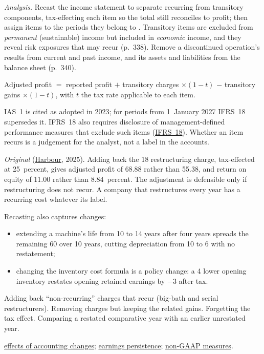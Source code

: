 \begin{qfmethod}
\emph{Analysis.} Recast the income statement to separate recurring from transitory components, tax-effecting each item so the total still reconciles to profit; then assign items to the periods they belong to \citep[pp.~602--603]{financial-statement-analysis-2009}. Transitory items are excluded from \emph{permanent} (sustainable) income but included in \emph{economic} income, and they reveal risk exposures that may recur (p.~338). Remove a discontinued operation's results from current and past income, and its assets and liabilities from the balance sheet (p.~340).

 Adjusted profit $=$ reported profit $+$ transitory charges $\times(1-t)$ $-$ transitory gains $\times(1-t)$, with $t$ the tax rate applicable to each item.

 IAS~1 is cited as adopted in 2023; for periods from 1~January 2027 IFRS~18 supersedes it. IFRS~18 also requires disclosure of management-defined performance measures that exclude such items (\hyperref[meth:accounting-change-effects]{IFRS~18}). Whether an item recurs is a judgement for the analyst, not a label in the accounts.

 \emph{Original} (\hyperref[ex:harbour-tools-statements]{Harbour}, 2025). Adding back the 18 restructuring charge, tax-effected at 25~percent, gives adjusted profit of 68.88 rather than 55.38, and return on equity of 11.00 rather than 8.84~percent. The adjustment is defensible only if restructuring does not recur. A company that restructures every year has a recurring cost whatever its label.

Recasting also captures changes:
\begin{itemize}
\item extending a machine's life from 10 to 14 years after four years spreads the remaining 60 over 10 years, cutting depreciation from 10 to 6 with no restatement;
\item changing the inventory cost formula is a policy change: a 4 lower opening inventory restates opening retained earnings by $-3$ after tax.
\end{itemize}

 Adding back ``non-recurring'' charges that recur (big-bath and serial restructurers). Removing charges but keeping the related gains. Forgetting the tax effect. Comparing a restated comparative year with an earlier unrestated year.

 \hyperref[meth:accounting-change-effects]{effects of accounting changes}; \hyperref[meth:earnings-quality-persistence]{earnings persistence}; \hyperref[meth:earnings-management-presentation]{non-GAAP measures}.

\end{qfmethod}

